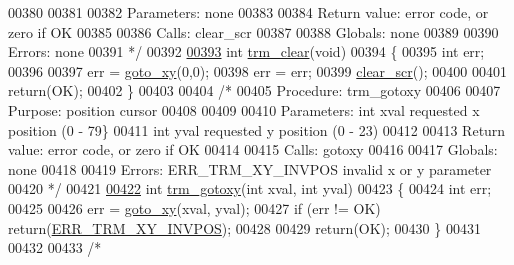 \begin{DoxyCode}
00380 \textcolor{comment}{}
00381 \textcolor{comment}{}
00382 \textcolor{comment}{        Parameters:     none}
00383 \textcolor{comment}{}
00384 \textcolor{comment}{        Return value: error code, or zero if OK}
00385 \textcolor{comment}{}
00386 \textcolor{comment}{        Calls:  clear\_scr}
00387 \textcolor{comment}{}
00388 \textcolor{comment}{        Globals: none}
00389 \textcolor{comment}{}
00390 \textcolor{comment}{        Errors: none}
00391 \textcolor{comment}{*/}
00392 
\hypertarget{trmdrive_8c_source_l00393}{}\hyperlink{trmdrive_8h_ae586641189b36f988e24e938899d2dee}{00393} \textcolor{keywordtype}{int} \hyperlink{trmdrive_8c_ae586641189b36f988e24e938899d2dee}{trm_clear}(\textcolor{keywordtype}{void})
00394 \{
00395         \textcolor{keywordtype}{int} err;
00396 
00397         err = \hyperlink{trmdrive_8c_a7dce95f2c134d55014f3b3fa1de35d33}{goto_xy}(0,0);
00398         err = err;
00399         \hyperlink{trmdrive_8c_af83e4fe07f82e4efe77504d26b445b25}{clear_scr}();
00400 
00401         \textcolor{keywordflow}{return}(OK);
00402 \}
00403 
00404 \textcolor{comment}{/*}
00405 \textcolor{comment}{        Procedure: trm\_gotoxy}
00406 \textcolor{comment}{}
00407 \textcolor{comment}{        Purpose: position cursor}
00408 \textcolor{comment}{}
00409 \textcolor{comment}{}
00410 \textcolor{comment}{        Parameters:     int xval        requested x position (0 - 79\}}
00411 \textcolor{comment}{                        int yval        requested y position (0 - 23)}
00412 \textcolor{comment}{}
00413 \textcolor{comment}{        Return value: error code, or zero if OK}
00414 \textcolor{comment}{}
00415 \textcolor{comment}{        Calls:  gotoxy}
00416 \textcolor{comment}{}
00417 \textcolor{comment}{        Globals: none}
00418 \textcolor{comment}{}
00419 \textcolor{comment}{        Errors: ERR\_TRM\_XY\_INVPOS invalid x or y parameter}
00420 \textcolor{comment}{*/}
00421 
\hypertarget{trmdrive_8c_source_l00422}{}\hyperlink{trmdrive_8h_ace638fe5b8176ecc1997df1486d6ee09}{00422} \textcolor{keywordtype}{int} \hyperlink{trmdrive_8c_a041851ec0fe17185a897a43597fb146a}{trm_gotoxy}(\textcolor{keywordtype}{int} xval, \textcolor{keywordtype}{int} yval)
00423 \{
00424         \textcolor{keywordtype}{int} err;
00425 
00426         err = \hyperlink{trmdrive_8c_a7dce95f2c134d55014f3b3fa1de35d33}{goto_xy}(xval, yval);
00427         \textcolor{keywordflow}{if} (err != OK) \textcolor{keywordflow}{return}(\hyperlink{trmdrive_8h_a5e245d8c878f1c2db3d67e26bf79c614}{ERR_TRM_XY_INVPOS});
00428 
00429         \textcolor{keywordflow}{return}(OK);
00430 \}
00431 
00432 
00433 \textcolor{comment}{/*}

\end{DoxyCode}
